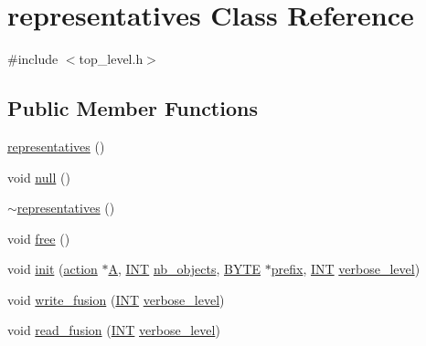 \hypertarget{classrepresentatives}{}\section{representatives Class Reference}
\label{classrepresentatives}


{\ttfamily \#include $<$top\+\_\+level.\+h$>$}

\subsection*{Public Member Functions}
\begin{DoxyCompactItemize}
\item 
\mbox{\hyperlink{classrepresentatives_a1048087011f3c333bee9e6b263ee5032}{representatives}} ()
\item 
void \mbox{\hyperlink{classrepresentatives_aee4c6aa01c4907a044ba4d3034962e85}{null}} ()
\item 
\mbox{\hyperlink{classrepresentatives_a982ee727309ddc7b76dd09a804ff4da3}{$\sim$representatives}} ()
\item 
void \mbox{\hyperlink{classrepresentatives_a224f85f22dd0406a97e626551beb9445}{free}} ()
\item 
void \mbox{\hyperlink{classrepresentatives_ae3d1d5911e48bb0086264840f942370e}{init}} (\mbox{\hyperlink{classaction}{action}} $\ast$\mbox{\hyperlink{classrepresentatives_a5451180b2d127fa44513c16490dca7ac}{A}}, \mbox{\hyperlink{galois_8h_a09fddde158a3a20bd2dcadb609de11dc}{I\+NT}} \mbox{\hyperlink{classrepresentatives_a1084b592bbd5f51427c222ff1e414f71}{nb\+\_\+objects}}, \mbox{\hyperlink{galois_8h_ab6cc7b4aeb6ea31aba2b3fbfc83ff5e6}{B\+Y\+TE}} $\ast$\mbox{\hyperlink{classrepresentatives_a455a6a25f9bcfb0e49a16dc03b13c1d9}{prefix}}, \mbox{\hyperlink{galois_8h_a09fddde158a3a20bd2dcadb609de11dc}{I\+NT}} \mbox{\hyperlink{simeon_8_c_a818073fbcc2f439e7c56952f67386122}{verbose\+\_\+level}})
\item 
void \mbox{\hyperlink{classrepresentatives_a0f72413543cd660254b19cc5a49bfc39}{write\+\_\+fusion}} (\mbox{\hyperlink{galois_8h_a09fddde158a3a20bd2dcadb609de11dc}{I\+NT}} \mbox{\hyperlink{simeon_8_c_a818073fbcc2f439e7c56952f67386122}{verbose\+\_\+level}})
\item 
void \mbox{\hyperlink{classrepresentatives_a5ced64d9af0c5e0ad46b9ba6244ac332}{read\+\_\+fusion}} (\mbox{\hyperlink{galois_8h_a09fddde158a3a20bd2dcadb609de11dc}{I\+NT}} \mbox{\hyperlink{simeon_8_c_a818073fbcc2f439e7c56952f67386122}{verbose\+\_\+level}})
\item 

\end{DoxyCompactItemize}

